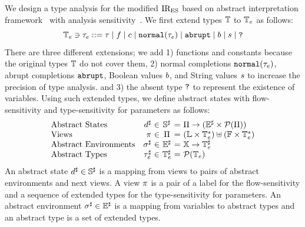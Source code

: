 We design a type analysis for the modified ${\text{IR}_\text{ES}}$ based on abstract
interpretation framework~\cite{ai1977, ai1992} with analysis
sensitivity~\cite{sens-toplas}.  We first extend types $\mathbb{T}$ to $\mathbb{T}_e$ as
follows:
\[
  \mathbb{T}_e \ni \tau_e ::=
  \tau \mid
  f \mid
  c \mid
  \texttt{normal}(\tau_e) \mid
  \texttt{abrupt} \mid
  b \mid
  s \mid
  \texttt{?}
\]
There are three different extensions; we add 1) functions and constants
because the original types $\mathbb{T}$ do not cover them, 2) normal completions
$\texttt{normal}(\tau_e)$, abrupt completions $\texttt{abrupt}$, Boolean values $b$, and
String values $s$ to increase the precision of type analysis. and 3) the
absent type $\texttt{?}$ to represent the existence of variables.  Using such
extended types, we define abstract states with flow-sensitivity and
type-sensitivity for parameters as follows:
\[
  \begin{array}{lr@{~}c@{~}c@{~}r@{~}l}
    \text{Abstract States}
    &\aelem&\in&\adom&=&
    \viewset \rightarrow (\aenvset \times \partsof{\viewset})\\

    \text{Views}
    &\view&\in&\viewset&=&
    (\labset \times \etyset^*) \uplus
    (\funcset \times \etyset^*)\\

    \text{Abstract Environments}
    &\aenv&\in&\aenvset&=&\varset \rightarrow \atyset\\

    \text{Abstract Types}
    &\aty&\in&\atyset&=&\partsof{\etyset}\\
  \end{array}
\]
An abstract state ${d}^\sharp \in {\mathbb{S}}^\sharp$ is a mapping from views to pairs of
abstract environments and next views.  A view $\pi$ is a pair of a label for
the flow-sensitivity and a
sequence of extended types for the type-sensitivity for parameters.  An abstract
environment ${\sigma}^\sharp \in {\mathbb{E}}^\sharp$ is a mapping from variables to abstract types
and an abstract type is a set of extended types.


